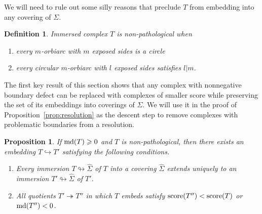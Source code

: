 \documentclass{amsart}
\newtheorem{definition}[conjecture]{Definition}
\newtheorem{proposition}[conjecture]{Proposition}
\newcommand{\md}{\textnormal{md}}
\newcommand{\tn}{\textnormal}
\newcommand{\whS}{{\widehat{\Sigma}}}
\begin{document}
We will need to rule out some silly reasons that preclude $T$ from embedding into any covering of $\Sigma$.
\begin{definition}\label{def:nonpato}
Immersed complex $T$ is \emph{non-pathological} when
\begin{enumerate}
\item every $m$-orbiarc with $m$ exposed sides is a circle
\item every circular $m$-orbiarc with $l$ exposed sides satisfies $l|m$.
\end{enumerate}
\end{definition}

The first key result of this section shows that any complex with nonnegative boundary defect can be replaced with complexes of smaller score while preserving the set of its embeddings into coverings of $\Sigma$. We will use it in the proof of Proposition~\ref{prop:resolution} as the descent step to remove complexes with problematic boundaries from a resolution.
\begin{proposition}\label{prop:resolve_defect}
If $\md(T)\geqslant0$ and $T$ is non-pathological, then there exists an embedding $T\hookrightarrow T'$ satisfying the following conditions.
\begin{enumerate}
\item Every immersion $T\looparrowright\whS$ of $T$ into a covering $\whS$ extends uniquely to an immersion $T'\looparrowright\whS$ of $T'$.
\item All quotients $T'\twoheadrightarrow T''$ in which $T$ embeds satisfy $\tn{score}(T'')<\tn{score}(T)$ or $\md(T'')<0$.
\end{enumerate}
\end{proposition}
\end{document}
